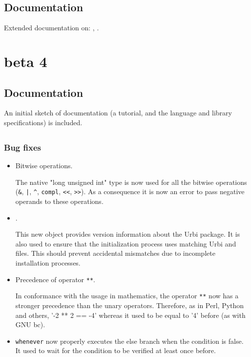 \subsection{Documentation}

Extended documentation on: , .


\section{ beta 4}

\subsection{Documentation}

An initial sketch of documentation (a tutorial, and the language and
library specifications) is included.

\subsection{\us}
\subsubsection{Bug fixes}

\begin{itemize}
\item Bitwise operations.

  The native "long unsigned int" type is now used for all the bitwise
  operations (\lstinline|&|, \lstinline{|}, \lstinline|^|,
  \lstinline|compl|, \lstinline|<<|, \lstinline|>>|).  As a consequence it
  is now an error to pass negative operands to these operations.

\item {}.

  This new object provides version information about the Urbi package.  It
  is also used to ensure that the initialization process uses matching Urbi
  and \Cxx files.  This should prevent accidental mismatches due to
  incomplete installation processes.

\item Precedence of operator \lstinline|**|.

  In conformance with the usage in mathematics, the operator \lstinline|**|
  now has a stronger precedence than the unary operators.  Therefore, as in
  Perl, Python and others, '-2 ** 2 == -4' whereas it used to be equal to
  '4' before (as with GNU bc).

\item \lstinline|whenever| now properly executes the else branch when the
  condition is false.  It used to wait for the condition to be verified at
  least once before.
\end{itemize}

